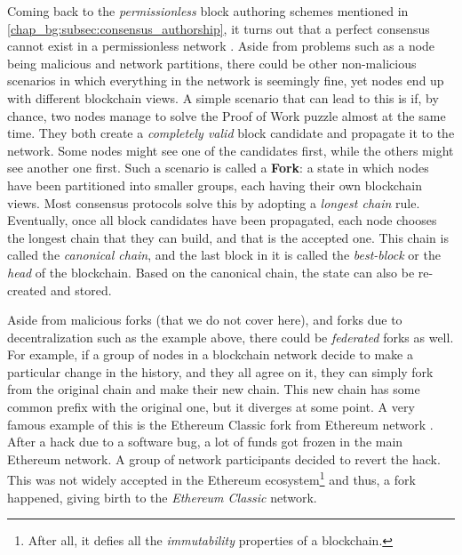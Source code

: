 Coming back to the \textit{permissionless} block authoring schemes mentioned in
\ref{chap_bg:subsec:consensus_authorship}, it turns out that a perfect consensus cannot exist in a
permissionless network \cite{wangSurveyConsensusMechanisms2019}. Aside from problems such as a node
being malicious and network partitions, there could be other non-malicious scenarios in which
everything in the network is seemingly fine, yet nodes end up with different blockchain views. A
simple scenario that can lead to this is if, by chance, two nodes manage to solve the Proof of Work
puzzle almost at the same time. They both create a \textit{completely valid} block candidate and
propagate it to the network. Some nodes might see one of the candidates first, while the others
might see another one first. Such a scenario is called a \textbf{Fork}: a state in which nodes have
been partitioned into smaller groups, each having their own blockchain views. Most consensus
protocols solve this by adopting a \textit{longest chain} rule. Eventually, once all block
candidates have been propagated, each node chooses the longest chain that they can build, and that
is the accepted one. This chain is called the \textit{canonical chain}, and the last block in it is
called the \textit{best-block} or the \textit{head} of the blockchain. Based on the canonical chain,
the state can also be re-created and stored.

Aside from malicious forks (that we do not cover here), and forks due to decentralization such as
the example above, there could be \textit{federated} forks as well. For example, if a group of nodes
in a blockchain network decide to make a particular change in the history, and they all agree on it,
they can simply fork from the original chain and make their new chain. This new chain has some
common prefix with the original one, but it diverges at some point. A very famous example of this is
the Ethereum Classic fork from Ethereum network \cite{vignaGreatDigitalCurrencyDebate2016}. After a
hack due to a software bug, a lot of funds got frozen in the main Ethereum network. A group of
network participants decided to revert the hack. This was not widely accepted in the Ethereum
ecosystem\footnote{After all, it defies all the \textit{immutability} properties of a blockchain.}
and thus, a fork happened, giving birth to the \textit{Ethereum Classic} network.


